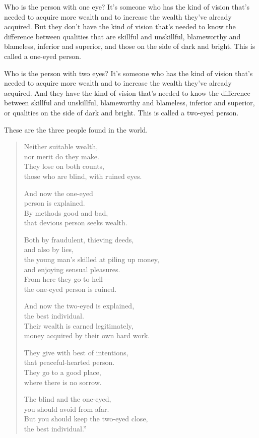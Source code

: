 \documentclass[12pt,openany]{book}%
\begin{document}
Who is the person with one eye? It’s someone who has the kind of vision that’s needed to acquire more wealth and to increase the wealth they’ve already acquired. But they don’t have the kind of vision that’s needed to know the difference between qualities that are skillful and unskillful, blameworthy and blameless, inferior and superior, and those on the side of dark and bright. This is called a one-eyed person. 

Who is the person with two eyes? It’s someone who has the kind of vision that’s needed to acquire more wealth and to increase the wealth they’ve already acquired. And they have the kind of vision that’s needed to know the difference between skillful and unskillful, blameworthy and blameless, inferior and superior, or qualities on the side of dark and bright. This is called a two-eyed person. 

These are the three people found in the world. 

\begin{verse}%
Neither suitable wealth, \\
nor merit do they make. \\
They lose on both counts, \\
those who are blind, with ruined eyes. 

And now the one-eyed \\
person is explained. \\
By methods good and bad, \\
that devious person seeks wealth. 

Both by fraudulent, thieving deeds, \\
and also by lies, \\
the young man’s skilled at piling up money, \\
and enjoying sensual pleasures. \\
From here they go to hell—\\
the one-eyed person is ruined. 

And now the two-eyed is explained, \\
the best individual. \\
Their wealth is earned legitimately, \\
money acquired by their own hard work. 

They give with best of intentions, \\
that peaceful-hearted person. \\
They go to a good place, \\
where there is no sorrow. 

The blind and the one-eyed, \\
you should avoid from afar. \\
But you should keep the two-eyed close, \\
the best individual.” 

%
\end{verse}
\end{document}
